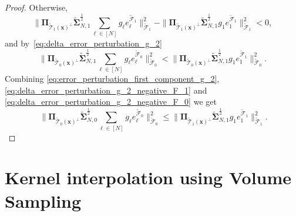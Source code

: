 \documentclass[twoside,11pt]{book}
\numberwithin{theorem}{chapter}
\numberwithin{definition}{chapter}
\numberwithin{proposition}{chapter}
\numberwithin{corollary}{chapter}
\numberwithin{example}{chapter}
\numberwithin{lemma}{chapter}
\numberwithin{assumption}{chapter}
\begin{document}
\begin{proof}
Otherwise,  
\begin{equation}\label{eq:delta_error_perturbation_g_2_negative_F_1}
 \|\bm{\Pi}_{\tilde{\mathcal{T}}_{1}(\bm{x})^{\perp}} \tilde{\bm{\Sigma}}_{N,1}^{\frac{1}{2}} \sum\limits_{\ell \in [N]}g_{\ell} e_{\ell}^{\tilde{\mathcal{F}}_{1}}\|_{\tilde{\mathcal{F}}_{1}}^{2} - \|\bm{\Pi}_{\tilde{\mathcal{T}}_{1}(\bm{x})^{\perp}} \tilde{\bm{\Sigma}}_{N,1}^{\frac{1}{2}} g_{1} e_{1}^{\tilde{\mathcal{F}}_{1}}\|_{\tilde{\mathcal{F}}_{1}}^{2} < 0, 
\end{equation}
and by~\eqref{eq:delta_error_perturbation_g_2}
\begin{equation}\label{eq:delta_error_perturbation_g_2_negative_F_0}
\|\bm{\Pi}_{\tilde{\mathcal{T}}_{0}(\bm{x})^{\perp}} \tilde{\bm{\Sigma}}_{N,1}^{\frac{1}{2}} \sum\limits_{\ell \in [N]}g_{\ell} e_{\ell}^{\tilde{\mathcal{F}}_{0}}\|_{\tilde{\mathcal{F}}_{0}}^{2} < \|\bm{\Pi}_{\tilde{\mathcal{T}}_{0}(\bm{x})^{\perp}} \tilde{\bm{\Sigma}}_{N,1}^{\frac{1}{2}} g_{1} e_{1}^{\tilde{\mathcal{F}}_{1}}\|_{\tilde{\mathcal{F}}_{0}}^{2}.
\end{equation}
Combining \eqref{eq:error_perturbation_first_component_g_2}, \eqref{eq:delta_error_perturbation_g_2_negative_F_1} and \eqref{eq:delta_error_perturbation_g_2_negative_F_0} 
we get
\begin{equation}
\:\|\bm{\Pi}_{\tilde{\mathcal{T}}_{0}(\bm{x})^{\perp}} \tilde{\bm{\Sigma}}_{N,0}^{\frac{1}{2}} \sum\limits_{\ell \in [N]}g_{\ell} e_{\ell}^{\tilde{\mathcal{F}}_{0}}\|_{\tilde{\mathcal{F}}_{0}}^{2} \leq \|\bm{\Pi}_{\tilde{\mathcal{T}}_{1}(\bm{x})^{\perp}} \tilde{\bm{\Sigma}}_{N,1}^{\frac{1}{2}} g_{1} e_{1}^{\tilde{\mathcal{F}}_{1}}\|_{\tilde{\mathcal{F}}_{1}}^{2}.
\end{equation}
\end{proof}


\clearpage

\chapter{Kernel interpolation using Volume Sampling}
\end{document}
